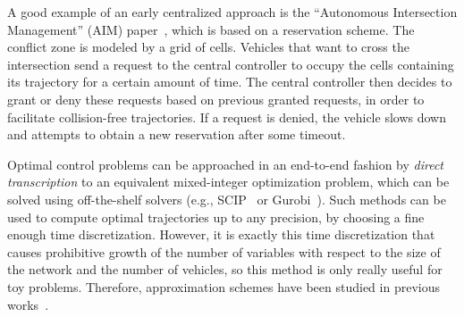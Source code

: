 \documentclass{article}
\theoremstyle{definition}
\theoremstyle{plain}
\begin{document}
A good example of an early centralized approach is the ``Autonomous Intersection
Management'' (AIM) paper~\cite{dresnerMultiagentApproachAutonomous2008}, which
is based on a reservation scheme. The conflict zone is modeled by a grid of
cells. Vehicles that want to cross the intersection send a request to the
central controller to occupy the cells containing its trajectory for a certain
amount of time. The central controller then decides to grant or deny these
requests based on previous granted requests, in order to facilitate
collision-free trajectories. If a request is denied, the vehicle slows down and
attempts to obtain a new reservation after some timeout.

Optimal control problems can be approached in an end-to-end fashion by
\textit{direct transcription} to an equivalent mixed-integer optimization
problem, which can be solved using off-the-shelf solvers (e.g.,
SCIP~\cite{BolusaniEtal2024OO} or Gurobi~\cite{gurobi}). Such methods can be
used to compute optimal trajectories up to any precision, by choosing a fine
enough time discretization. However, it is exactly this time discretization that
causes prohibitive growth of the number of variables with respect to the size of
the network and the number of vehicles, so this method is only really useful for
toy problems.
%
Therefore, approximation schemes have been studied in previous
works~\cite{hultApproximateSolutionOptimal2015,zhaoBilevelProgrammingModel2021,tallapragadaHierarchicaldistributedOptimizedCoordination2017}.
\end{document}
